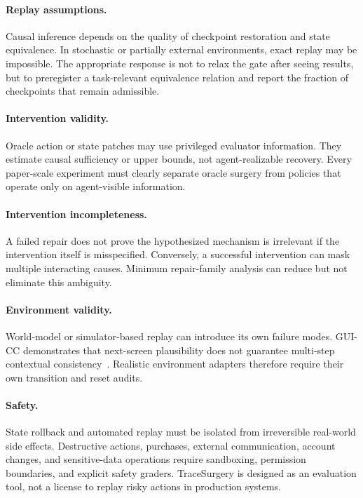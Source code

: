 \documentclass{article}
\begin{document}
\paragraph{Replay assumptions.}
Causal inference depends on the quality of checkpoint restoration and state equivalence. In stochastic or partially external environments, exact replay may be impossible. The appropriate response is not to relax the gate after seeing results, but to preregister a task-relevant equivalence relation and report the fraction of checkpoints that remain admissible.

\paragraph{Intervention validity.}
Oracle action or state patches may use privileged evaluator information. They estimate causal sufficiency or upper bounds, not agent-realizable recovery. Every paper-scale experiment must clearly separate oracle surgery from policies that operate only on agent-visible information.

\paragraph{Intervention incompleteness.}
A failed repair does not prove the hypothesized mechanism is irrelevant if the intervention itself is misspecified. Conversely, a successful intervention can mask multiple interacting causes. Minimum repair-family analysis can reduce but not eliminate this ambiguity.

\paragraph{Environment validity.}
World-model or simulator-based replay can introduce its own failure modes. GUI-CC demonstrates that next-screen plausibility does not guarantee multi-step contextual consistency~\citep{fu2026guicc}. Realistic environment adapters therefore require their own transition and reset audits.

\paragraph{Safety.}
State rollback and automated replay must be isolated from irreversible real-world side effects. Destructive actions, purchases, external communication, account changes, and sensitive-data operations require sandboxing, permission boundaries, and explicit safety graders. TraceSurgery is designed as an evaluation tool, not a license to replay risky actions in production systems.
\end{document}
